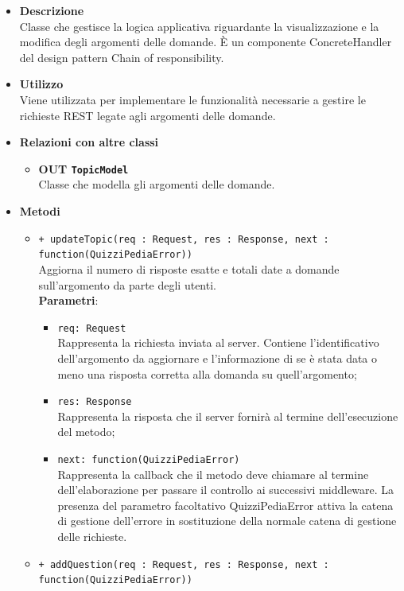 \begin{itemize}
	\item \textbf{Descrizione} \\
	Classe che gestisce la logica applicativa riguardante la visualizzazione e la modifica degli argomenti delle domande. È un componente ConcreteHandler del design pattern Chain of responsibility.
	\item \textbf{Utilizzo} \\
	Viene utilizzata per implementare le funzionalità necessarie a gestire le richieste REST legate agli argomenti delle domande.
	\item \textbf{Relazioni con altre classi}
		\begin{itemize}
			\item \textbf{OUT \texttt{TopicModel}} \\
			Classe che modella gli argomenti delle domande.
		\end{itemize}
	\item \textbf{Metodi}
		\begin{itemize}
			\item \texttt{+ updateTopic(req : Request, res : Response, next : function(QuizziPediaError))} \\
			Aggiorna il numero di risposte esatte e totali date a domande sull'argomento da parte degli utenti. \\
			\textbf{Parametri}:
			\begin{itemize}
			\item \texttt{req: Request} \\
			Rappresenta la richiesta inviata al server. Contiene l'identificativo dell'argomento da aggiornare e l'informazione di se è stata data o meno una risposta corretta alla domanda su quell'argomento;
			\item \texttt{res: Response} \\
			Rappresenta la risposta che il server fornirà al termine dell'esecuzione del metodo;
			\item \texttt{next: function(QuizziPediaError)} \\
			Rappresenta la callback che il metodo deve chiamare al termine dell'elaborazione per passare il controllo ai successivi middleware. La presenza del parametro facoltativo QuizziPediaError attiva la catena di gestione dell'errore in sostituzione della normale catena di gestione delle richieste.
			\end{itemize}
			\item \texttt{+ addQuestion(req : Request, res : Response, next : function(QuizziPediaError))} \\

\end{itemize}
\end{itemize}
